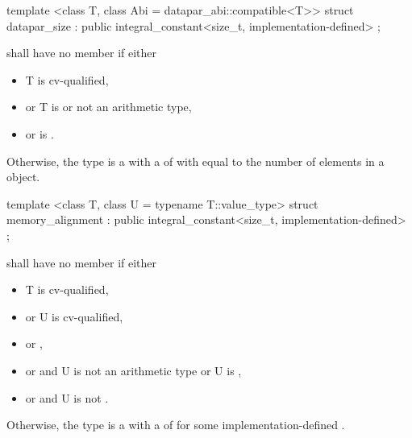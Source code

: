 \begin{itemdecl}
template <class T, class Abi = datapar_abi::compatible<T>>
struct datapar_size : public integral_constant<size_t, implementation-defined> {};
\end{itemdecl}
\begin{itemdescr}
  \pnum\label{datapar_size}%
   shall have no member  if either
  \begin{itemize}
    \item \type T is cv-qualified,
    \item or \type T is \bool or not an arithmetic type,
    \item or  is \false.
  \end{itemize}

  \pnum
  Otherwise, the type  is a \BinaryTypeTrait with a \BaseCharacteristic of  with  equal to the number of elements in a \datapar[<T, Abi>] object.

\end{itemdescr}

\begin{itemdecl}
template <class T, class U = typename T::value_type>
struct memory_alignment : public integral_constant<size_t, implementation-defined> {};
\end{itemdecl}
\begin{itemdescr}
  \pnum
   shall have no member  if either
  \begin{itemize}
    \item \type T is cv-qualified,
    \item or \type U is cv-qualified,
    \item or ,
    \item or  and \type U is not an arithmetic type or \type U is \bool,
    \item or  and \type U is not \bool.
  \end{itemize}

  \pnum
  Otherwise, the type  is a \BinaryTypeTrait with a \BaseCharacteristic of  for some implementation-defined .
\end{itemdescr}

